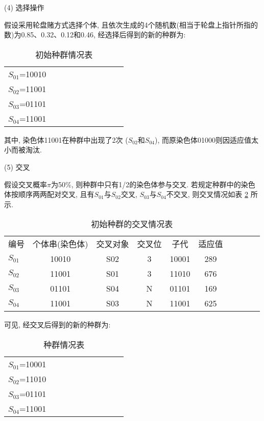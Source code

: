 (4) 选择操作

假设采用轮盘赌方式选择个体, 且依次生成的4个随机数(相当于轮盘上指针所指的数)为0.85、0.32、0.12和0.46, 经选择后得到的新的种群为:
\begin{table} [H]
\caption{初始种群情况表}
\vspace{-0.6cm}
\begin{center}
\begin{tabular} {lccccccccc}
\hline
    $S_{01}$=10010\\
    $S_{02}$=11001\\
    $S_{03}$=01101\\
    $S_{04}$=11001\\
\hline
\end{tabular}
\end{center}
\label{AI_table2019112803}\vspace{-0.4cm}
\end{table}
其中, 染色体11001在种群中出现了2次 ($S_{02}$和$S_{04}$), 而原染色体01000则因适应值太小而被淘汰.

(5) 交叉

假设交叉概率$\pi$为50\%, 则种群中只有1/2的染色体参与交叉.
若规定种群中的染色体按顺序两两配对交叉, 且有$S_{01}$与$S_{02}$交叉, $S_{03}$与$S_{04}$不交叉, 则交叉情况如表 \ref{AI_table2019112804} 所示.

\begin{table} [H]
\caption{初始种群的交叉情况表}
\vspace{-0.6cm}
\begin{center}
\begin{tabular} {lccccccccc}
  \hline
编号&	个体串(染色体)&	交叉对象	&交叉位&	  子代	& 适应值\\
$S_{01}$	&10010&	S02&	3	&10001	&289\\
$S_{02}$	&11001&	S01&	3	&11010	&676\\
$S_{03}$	&01101&	S04&	N	&01101	&169\\
$S_{04}$	&11001&	S03&	N	&11001	&625\\
\hline
\end{tabular}
\end{center}
\label{AI_table2019112804}\vspace{-0.4cm}
\end{table}

可见, 经交叉后得到的新的种群为:
\begin{table} [H]
\caption{种群情况表}
\vspace{-0.6cm}
\begin{center}
\begin{tabular} {lccccccccc}
\hline
    $S_{01}$=10001\\
    $S_{02}$=11010\\
    $S_{03}$=01101\\
    $S_{04}$=11001\\
\hline
\end{tabular}
\end{center}\vspace{-0.4cm}
\end{table}

